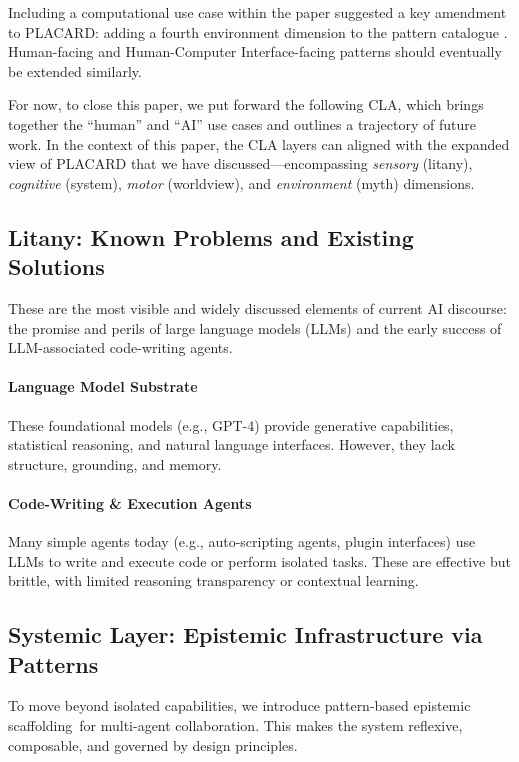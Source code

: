 \documentclass[acmlarge,timestamp]{acmart}
\begin{document}
{Including a computational use case within the paper suggested a key
amendment to PLACARD: adding a fourth environment dimension to the
pattern catalogue . Human-facing and Human-Computer Interface-facing
patterns should eventually be extended similarly.

For now, to close this paper, we put forward the following CLA, which
brings together the ``human'' and ``AI'' use cases and outlines a
trajectory of future work.  In the context of this paper, the CLA
layers can aligned with the expanded view of PLACARD that we have
discussed—encompassing \emph{sensory} (litany), \emph{cognitive}
(system), \emph{motor} (worldview), and \emph{environment} (myth)
dimensions.

\subsection*{ Litany: Known Problems and Existing Solutions}

These are the most visible and widely discussed elements of current AI
discourse: the promise and perils of large language models (LLMs) and
the early success of LLM-associated code-writing agents.

\paragraph{Language Model Substrate}

These foundational models (e.g., GPT-4) provide generative
capabilities, statistical reasoning, and natural language interfaces.
However, they lack structure, grounding, and memory.

\paragraph{Code-Writing \& Execution Agents}

Many simple agents today (e.g., auto-scripting agents, plugin
interfaces) use LLMs to write and execute code or perform isolated
tasks. These are effective but brittle, with limited reasoning
transparency or contextual learning.

\subsection*{ Systemic Layer: Epistemic Infrastructure via Patterns}

To move beyond isolated capabilities, we introduce pattern-based
epistemic scaffolding~for multi-agent collaboration. This makes the
system reflexive, composable, and governed by design principles.

}
\end{document}
